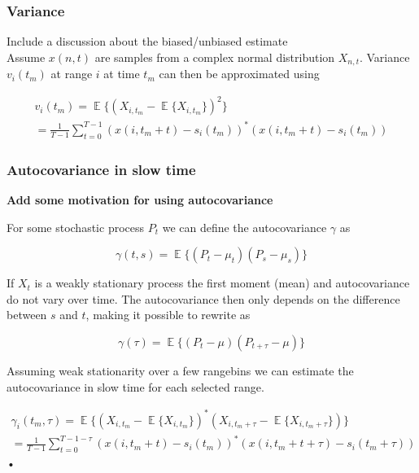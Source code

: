 \documentclass[a4paper, 12pt]{article}
\DeclareMathOperator*{\E}{\mathbb{E}}
\begin{document}
\subsubsection{Variance}

Include a discussion about the biased/unbiased estimate \\

Assume $x(n,t)$ are samples from a complex normal distribution $X_{n,t}$. Variance $v_i(t_m)$ at range $i$ at time $t_m$ can then be approximated using

\begin{equation}
\label{eq:var}
\begin{gathered}
	v_i(t_m) = \E\{ (X_{i,t_m} - \E\{X_{i,t_m}\})^2\} \\
	= \frac{1}{T-1}\sum_{t=0}^{T-1}(x(i, t_m + t) - s_i(t_m))^*(x(i, t_m + t) -  s_i(t_m))
\end{gathered}
\end{equation}

\subsubsection{Autocovariance in slow time}

\textbf{Add some motivation for using autocovariance}

\noindent
For some stochastic process $P_t$ we can define the autocovariance $\gamma$ as

\begin{equation}
	\gamma(t, s) = \E\big\{(P_t - \mu_t)(P_s - \mu_s)\big\}
\end{equation}

If $X_t$ is a weakly stationary process the first moment (mean) and autocovariance do not vary over time.  The autocovariance then only depends on the difference between $s$ and $t$, making it possible to rewrite as

\begin{equation}
	\gamma(\tau) = \E\big\{(P_t - \mu)(P_{t+\tau} - \mu)\big\}
\end{equation}

Assuming weak stationarity over a few rangebins we can estimate the autocovariance in slow time for each selected range. 

\begin{equation}
\begin{gathered}
	\gamma_i(t_m, \tau) = \E\big\{(X_{i,t_m} - \E\{X_{i, t_m}\})^*(X_{i, t_m+\tau} - \E\{X_{i, t_m+\tau}\})\big\}\\
	= \frac{1}{T-1}\sum_{t=0}^{T-1-\tau}(x(i, t_m + t) - s_i(t_m))^*(x(i, t_m + t + \tau) - s_i(t_m + \tau))
\end{gathered}
\end{equation}•
\end{document}
